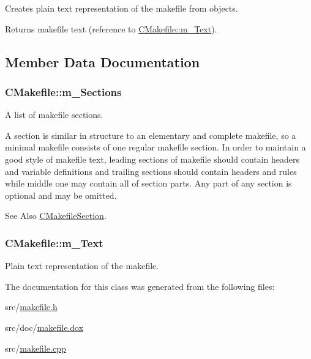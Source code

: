 Creates plain text representation of the makefile from objects. 

\begin{DoxyReturn}{Returns}
makefile text (reference to \hyperlink{classCMakefile_aee12188307be6d4ba12e877b29f7ea3d}{C\-Makefile\-::m\-\_\-\-Text}). 
\end{DoxyReturn}


\subsection{Member Data Documentation}
\hypertarget{classCMakefile_a79350f26dda9d7a9825718956f34c3b7}{
\subsubsection[{m\-\_\-\-Sections}]{\setlength{\rightskip}{0pt plus 5cm}C\-Makefile\-::m\-\_\-\-Sections\hspace{0.3cm}{\ttfamily [private]}}}\label{classCMakefile_a79350f26dda9d7a9825718956f34c3b7}


A list of makefile sections. 

A section is similar in structure to an elementary and complete makefile, so a minimal makefile consists of one regular makefile section. In order to maintain a good style of makefile text, leading sections of makefile should contain headers and variable definitions and trailing sections should contain headers and rules while middle one may contain all of section parts. Any part of any section is optional and may be omitted.

\begin{DoxySeeAlso}{See Also}
\hyperlink{classCMakefileSection}{C\-Makefile\-Section}. 
\end{DoxySeeAlso}
\hypertarget{classCMakefile_aee12188307be6d4ba12e877b29f7ea3d}{
\subsubsection[{m\-\_\-\-Text}]{\setlength{\rightskip}{0pt plus 5cm}C\-Makefile\-::m\-\_\-\-Text\hspace{0.3cm}{\ttfamily [private]}}}\label{classCMakefile_aee12188307be6d4ba12e877b29f7ea3d}


Plain text representation of the makefile. 



The documentation for this class was generated from the following files\-:\begin{DoxyCompactItemize}
\item 
src/\hyperlink{makefile_8h}{makefile.\-h}\item 
src/doc/\hyperlink{makefile_8dox}{makefile.\-dox}\item 
src/\hyperlink{makefile_8cpp}{makefile.\-cpp}\end{DoxyCompactItemize}
